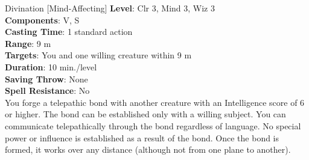 {Divination [Mind-Affecting]}
{
	\textbf{Level}: Clr 3, Mind 3, Wiz 3\\
	\textbf{Components}: V, S\\
	\textbf{Casting Time}: 1 standard action\\
	\textbf{Range}: 9 m\\
	\textbf{Targets}: You and one willing creature within 9 m\\
	\textbf{Duration}: 10 min./level\\
	\textbf{Saving Throw}: None\\
	\textbf{Spell Resistance}: No\\
}
{
	You forge a telepathic bond with another creature with an Intelligence score of 6 or higher. The bond can be established only with a willing subject. You can communicate telepathically through the bond regardless of language. No special power or influence is established as a result of the bond. Once the bond is formed, it works over any distance (although not from one plane to another).
}